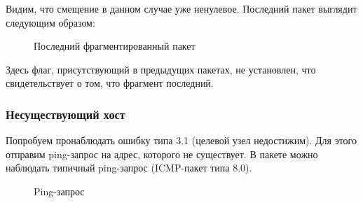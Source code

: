 \documentclass[a4paper, 14pt,russian]{article}
\begin{document}
		\newpage
		Видим, что смещение в данном случае уже ненулевое. Последний пакет выглядит следующим образом:
		\begin{figure}[h!]
			\caption{Последний фрагментированный пакет}
			\label{img:frag_ping}
		\end{figure}
	
		Здесь флаг, присутствующий в предыдущих пакетах, не установлен, что свидетельствует о том, что фрагмент последний. 	
	
	\subsubsection{Несуществующий хост}
	Попробуем пронаблюдать ошибку типа 3.1 (целевой узел недостижим). Для этого отправим ping-запрос на адрес, которого не существует.																																						
	В пакете можно наблюдать типичный ping-запрос (ICMP-пакет типа 8.0).

	\begin{figure}[h!]
		\caption{Ping-запрос}
		\label{img:error_ping}
	\end{figure}
\end{document}
